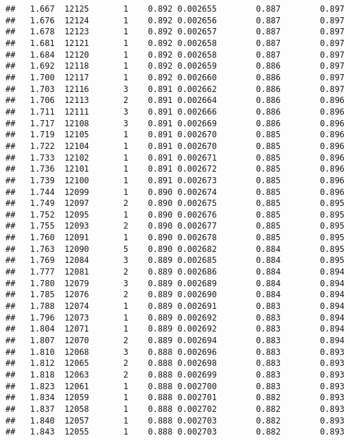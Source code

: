 \documentclass[
]{book}
\begin{document}
\begin{verbatim}
##   1.667  12125       1    0.892 0.002655        0.887        0.897
##   1.676  12124       1    0.892 0.002656        0.887        0.897
##   1.678  12123       1    0.892 0.002657        0.887        0.897
##   1.681  12121       1    0.892 0.002658        0.887        0.897
##   1.684  12120       1    0.892 0.002658        0.887        0.897
##   1.692  12118       1    0.892 0.002659        0.886        0.897
##   1.700  12117       1    0.892 0.002660        0.886        0.897
##   1.703  12116       3    0.891 0.002662        0.886        0.897
##   1.706  12113       2    0.891 0.002664        0.886        0.896
##   1.711  12111       3    0.891 0.002666        0.886        0.896
##   1.717  12108       3    0.891 0.002669        0.886        0.896
##   1.719  12105       1    0.891 0.002670        0.885        0.896
##   1.722  12104       1    0.891 0.002670        0.885        0.896
##   1.733  12102       1    0.891 0.002671        0.885        0.896
##   1.736  12101       1    0.891 0.002672        0.885        0.896
##   1.739  12100       1    0.891 0.002673        0.885        0.896
##   1.744  12099       1    0.890 0.002674        0.885        0.896
##   1.749  12097       2    0.890 0.002675        0.885        0.895
##   1.752  12095       1    0.890 0.002676        0.885        0.895
##   1.755  12093       2    0.890 0.002677        0.885        0.895
##   1.760  12091       1    0.890 0.002678        0.885        0.895
##   1.763  12090       5    0.890 0.002682        0.884        0.895
##   1.769  12084       3    0.889 0.002685        0.884        0.895
##   1.777  12081       2    0.889 0.002686        0.884        0.894
##   1.780  12079       3    0.889 0.002689        0.884        0.894
##   1.785  12076       2    0.889 0.002690        0.884        0.894
##   1.788  12074       1    0.889 0.002691        0.883        0.894
##   1.796  12073       1    0.889 0.002692        0.883        0.894
##   1.804  12071       1    0.889 0.002692        0.883        0.894
##   1.807  12070       2    0.889 0.002694        0.883        0.894
##   1.810  12068       3    0.888 0.002696        0.883        0.893
##   1.812  12065       2    0.888 0.002698        0.883        0.893
##   1.818  12063       2    0.888 0.002699        0.883        0.893
##   1.823  12061       1    0.888 0.002700        0.883        0.893
##   1.834  12059       1    0.888 0.002701        0.882        0.893
##   1.837  12058       1    0.888 0.002702        0.882        0.893
##   1.840  12057       1    0.888 0.002703        0.882        0.893
##   1.843  12055       1    0.888 0.002703        0.882        0.893

\end{verbatim}
\end{document}
